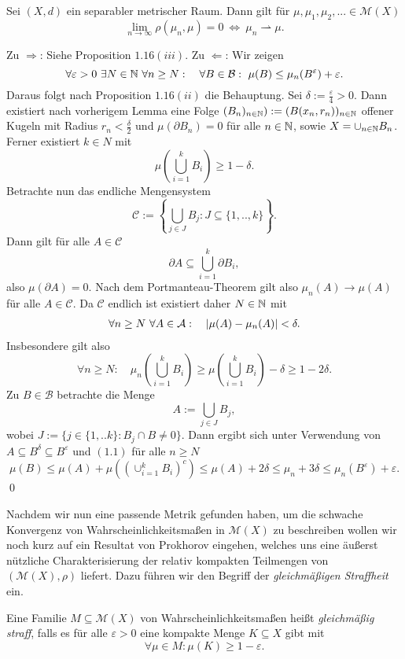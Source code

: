 \begin{theorem}
    Sei $(X,d)$ ein separabler metrischer Raum. Dann gilt für $\mu, \mu_1, \mu_2, ... \in \mathcal{M}(X)$
    $$
        \lim_{n \to \infty} \rho(\mu_n, \mu) = 0 \ \iff \ \mu_n \rightharpoonup \mu.  
    $$
\end{theorem}

\begin{proof*}
    Zu $\Rightarrow$: Siehe Proposition $1.16(iii)$.
    \newline 
    Zu $\Leftarrow$:  Wir zeigen
    $$
        \forall \varepsilon > 0 \ \exists N \in \N \ \forall n \geq N: \quad \forall B \in \mathcal{B}: \  \mu(B) \leq \mu_n(B^{\varepsilon}) + \varepsilon. 
    $$
    Daraus folgt nach Proposition $1.16(ii)$ die Behauptung. Sei $\delta := \frac{\varepsilon}{4} > 0$. 
    Dann existiert nach vorherigem Lemma eine Folge $(B_n)_{n \in \mathbb{N}}) := (B(x_n, r_n))_{n \in \mathbb{N}}$ offener Kugeln mit Radius $r_n < \frac{\delta}{2}$  
    und $\mu(\partial B_n) = 0$ für alle $n \in \mathbb{N}$, sowie $X = \cup_{n \in  \mathbb{N}}B_n$. Ferner existiert $k \in N$ mit
    $$
        \mu\left(\bigcup_{i=1}^k B_i\right) \geq 1 - \delta. 
    $$
    Betrachte nun das endliche Mengensystem 
    $$
        \mathcal{C} := \left\{ \bigcup_{j \in J}B_j : J \subseteq \{1,..,k\}\right\}. 
    $$
    Dann gilt für alle $A \in \mathcal{C}$
    $$
        \partial A \subseteq \bigcup_{i=1}^k \partial B_i,
    $$
    also $\mu(\partial A) = 0$. Nach dem Portmanteau-Theorem gilt also $\mu_n(A) \to \mu(A)$ für alle $A \in \mathcal{C}$. Da $\mathcal{C}$ endlich ist existiert daher $N \in \mathbb{N}$ mit
    \begin{align}
        \forall n \geq N \ \forall A \in \mathcal{A}: \quad \left| \mu(A) - \mu_n(A) \right| < \delta. 
    \end{align}
    Insbesondere gilt also
    $$
        \forall n \geq N: \quad \mu_n\left(\bigcup_{i=1}^k B_i\right) \geq \mu\left(\bigcup_{i=1}^k B_i\right) - \delta \geq 1 - 2\delta. 
    $$
    Zu $B \in \mathcal{B}$ betrachte die Menge 
    $$
        A := \bigcup_{j \in J} B_j,
    $$
    wobei $J := \{j \in \{1,..k\}: B_j \cap B \neq 0 \}$. Dann ergibt sich unter Verwendung von $A \subseteq B^{\delta} \subseteq B^{\varepsilon}$ und $(1.1)$ für alle $n \geq N$ 
    $$
        \mu(B) \leq \mu(A) + \mu\left((\cup_{i=1}^k B_i)^c\right) \leq \mu(A) + 2\delta \leq \mu_n + 3\delta \leq \mu_n(B^{\varepsilon}) + \varepsilon. 
    $$
    \qed
    
\end{proof*}
Nachdem wir nun eine passende Metrik gefunden haben, um die schwache Konvergenz von Wahrscheinlichkeitsmaßen in $\mathcal{M}(X)$ zu beschreiben wollen wir noch kurz auf ein Resultat von Prokhorov eingehen, 
welches uns eine äußerst nützliche Charakterisierung der relativ kompakten Teilmengen von $(\mathcal{M}(X), \rho)$ liefert. 
Dazu führen wir den Begriff der \textit{gleichmäßigen Straffheit} ein.  
\begin{mydef}
    Eine Familie $M \subseteq \mathcal{M}(X)$ von Wahrscheinlichkeitsmaßen heißt \textit{gleichmäßig straff}, 
    falls es für alle $\varepsilon > 0$ eine kompakte Menge $K \subseteq X$ gibt mit 
    $$
        \forall \mu \in M: \mu(K) \geq 1-\varepsilon. 
    $$
\end{mydef}

